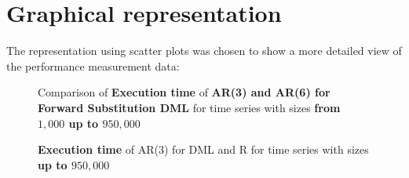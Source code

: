 \clearpage
\section{Graphical representation}
\setcounter{figure}{0}   

The representation using scatter plots was chosen to show a more detailed view of the performance measurement data:


\begin{figure}[ht]
	\centering
	\caption{Comparison of \textbf{Execution time} of \textbf{AR(3) and AR(6) for Forward Substitution DML} for time series with sizes \textbf{from $1,000$ up to $950,000$} }
    \label{apx-fig:ar-comparison-forwardsun}
\end{figure}

\begin{figure}[ht]
	\centering
	\caption{\textbf{Execution time} of AR(3) for DML and R for time series with sizes \textbf{up to $950,000$} }
    \label{apx-fig:ar3-exectime-scatter-all_big}
\end{figure}

